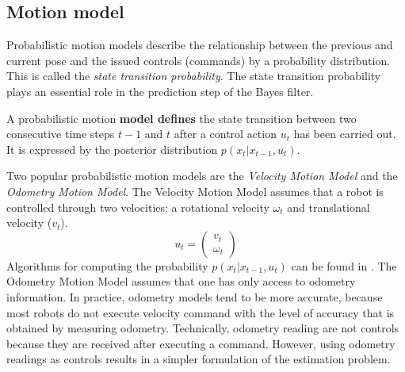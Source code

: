 {		\subsection{Motion model}
		\label{sec:motion_model}
Probabilistic motion models describe the relationship between the previous and current pose and the issued controls (commands) by a probability distribution. This is called the \textit{state transition probability}.
The state transition probability plays an essential role in the prediction step of the Bayes filter.
\begin{mydef}
A probabilistic motion \textbf{model defines} the state transition between two consecutive time steps $t-1$ and $t$ after a control action $u_{t}$ has been carried out. It is expressed by the posterior distribution $p (x_t | x_{t-1}, u_{t})$.
\end{mydef}
Two popular probabilistic motion models are the \textit{Velocity Motion Model} and the \textit{Odometry Motion Model}.
The Velocity Motion Model assumes that a robot is controlled through two velocities: a rotational velocity $\omega_t$ and translational velocity ($v_t$).
\begin{equation}
u_t = 
\left( \begin{array}{c}
v_t \\
\omega_t \end{array} \right)
\end{equation}
Algorithms for computing the probability $p (x_t | x_{t-1}, u_{t})$ can be found in \cite{fox2005probabilistic}.
The Odometry Motion Model assumes that one has only access to odometry information.
In practice, odometry models tend to be more accurate, because most robots do not execute velocity command with the level of accuracy that is obtained by measuring odometry.
Technically, odometry reading are not controls because they are received after executing a command.
However, using odometry readings as controls results in a simpler formulation of the estimation problem.

}

